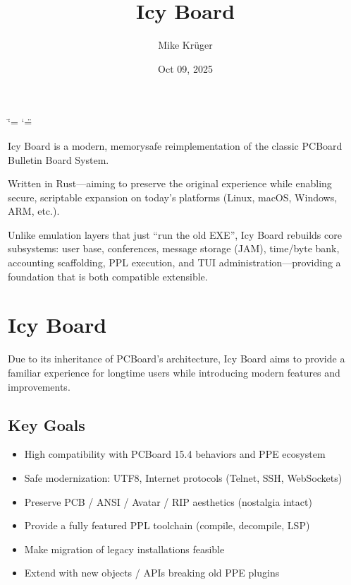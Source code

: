 \documentclass[letterpaper,10pt,english]{sphinxmanual}
\title{Icy Board}
\date{Oct 09, 2025}
\author{Mike Krüger}
\let\sphinxpxdimen\pdfpxdimen\else\newdimen\sphinxpxdimen
\begin{document}
\ifdefined\shorthandoff
  \ifnum\catcode`\=\string=\active\shorthandoff{=}\fi
  \ifnum\catcode`\"=\active{}\fi
\fi

\pagestyle{empty}
\sphinxmaketitle
\pagestyle{plain}
\sphinxtableofcontents
\pagestyle{normal}
\label{\detokenize{index::doc}}


\noindent\sphinxincludegraphics[width=400\sphinxpxdimen]{{login_screen}.png}

\sphinxAtStartPar
Icy Board is a modern, memory\sphinxhyphen{}safe re\sphinxhyphen{}implementation of the classic
PCBoard Bulletin Board System.

\sphinxAtStartPar
Written in Rust—aiming to preserve the original experience while
enabling secure, scriptable expansion on today’s platforms
(Linux, macOS, Windows, ARM, etc.).

\sphinxAtStartPar
Unlike emulation layers that just “run the old EXE”,
Icy Board rebuilds core subsystems:
user base, conferences, message storage (JAM),
time/byte bank, accounting scaffolding, PPL execution, and TUI
administration—providing a foundation that is both compatible 
extensible.


\chapter{Icy Board}
\label{\detokenize{index:icy-board}}
\sphinxAtStartPar
Due to its inheritance of PCBoard’s architecture, Icy Board aims to
provide a familiar experience for long\sphinxhyphen{}time users while introducing
modern features and improvements.


\section{Key Goals}
\label{\detokenize{index:key-goals}}\begin{itemize}
\item {} 
\sphinxAtStartPar
High compatibility with PCBoard 15.4 behaviors and PPE ecosystem

\item {} 
\sphinxAtStartPar
Safe modernization: UTF\sphinxhyphen{}8, Internet protocols (Telnet, SSH, WebSockets)

\item {} 
\sphinxAtStartPar
Preserve PCB / ANSI / Avatar / RIP aesthetics (nostalgia intact)

\item {} 
\sphinxAtStartPar
Provide a fully featured PPL toolchain (compile, decompile, LSP)

\item {} 
\sphinxAtStartPar
Make migration of legacy installations feasible

\item {} 
\sphinxAtStartPar
Extend with new objects / APIs  breaking old PPE plugins

\end{itemize}
\end{document}

